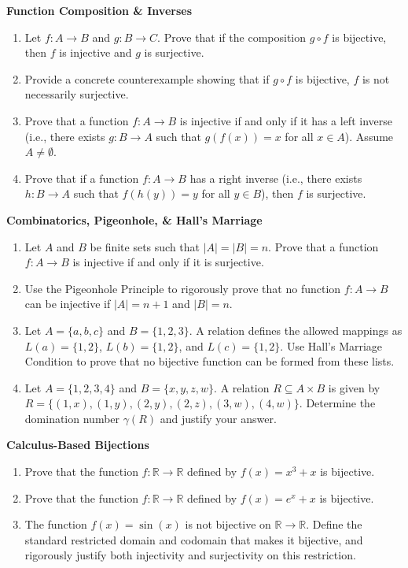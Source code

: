 \documentclass[11pt, letterpaper]{article}
\theoremstyle{definition}
\theoremstyle{remark}
\newcommand{\R}{\mathbb{R}}
\begin{document}
\textbf{Function Composition \& Inverses}
\begin{enumerate}[label=\textbf{\arabic*.}, resume]
    \item Let $f : A \to B$ and $g : B \to C$. Prove that if the composition $g \circ f$ is bijective, then $f$ is injective and $g$ is surjective.
    \item Provide a concrete counterexample showing that if $g \circ f$ is bijective, $f$ is not necessarily surjective.
    \item Prove that a function $f : A \to B$ is injective if and only if it has a left inverse (i.e., there exists $g : B \to A$ such that $g(f(x)) = x$ for all $x \in A$). Assume $A \neq \emptyset$.
    \item Prove that if a function $f : A \to B$ has a right inverse (i.e., there exists $h : B \to A$ such that $f(h(y)) = y$ for all $y \in B$), then $f$ is surjective.
\end{enumerate}

\textbf{Combinatorics, Pigeonhole, \& Hall's Marriage}
\begin{enumerate}[label=\textbf{\arabic*.}, resume]
    \item Let $A$ and $B$ be finite sets such that $|A| = |B| = n$. Prove that a function $f : A \to B$ is injective if and only if it is surjective.
    \item Use the Pigeonhole Principle to rigorously prove that no function $f : A \to B$ can be injective if $|A| = n + 1$ and $|B| = n$.
    \item Let $A = \{a, b, c\}$ and $B = \{1, 2, 3\}$. A relation defines the allowed mappings as $L(a) = \{1, 2\}$, $L(b) = \{1, 2\}$, and $L(c) = \{1, 2\}$. Use Hall's Marriage Condition to prove that no bijective function can be formed from these lists.
    \item Let $A = \{1, 2, 3, 4\}$ and $B = \{x, y, z, w\}$. A relation $R \subseteq A \times B$ is given by $R = \{(1, x), (1, y), (2, y), (2, z), (3, w), (4, w)\}$. Determine the domination number $\gamma(R)$ and justify your answer.
\end{enumerate}

\textbf{Calculus-Based Bijections}
\begin{enumerate}[label=\textbf{\arabic*.}, resume]
    \item Prove that the function $f : \R \to \R$ defined by $f(x) = x^3 + x$ is bijective.
    \item Prove that the function $f : \R \to \R$ defined by $f(x) = e^x + x$ is bijective.
    \item The function $f(x) = \sin(x)$ is not bijective on $\R \to \R$. Define the standard restricted domain and codomain that makes it bijective, and rigorously justify both injectivity and surjectivity on this restriction.
\end{enumerate}
\end{document}
